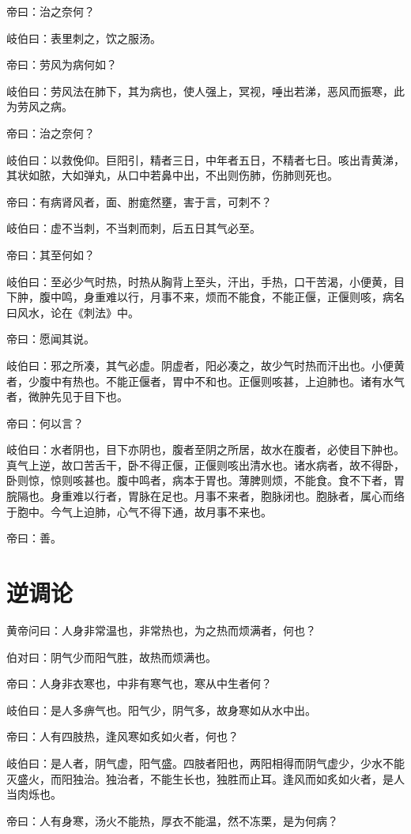 \documentclass{article}%
\begin{document}
帝曰：治之奈何？

岐伯曰：表里刺之，饮之服汤。

帝曰：劳风为病何如？

岐伯曰：劳风法在肺下，其为病也，使人强上，冥视，唾出若涕，恶风而振寒，此为劳风之病。

帝曰：治之奈何？

岐伯曰：以救俛仰。巨阳引，精者三日，中年者五日，不精者七日。咳出青黄涕，其状如脓，大如弹丸，从口中若鼻中出，不出则伤肺，伤肺则死也。

帝曰：有病肾风者，面、胕痝然壅，害于言，可刺不？

岐伯曰：虚不当刺，不当刺而刺，后五日其气必至。

帝曰：其至何如？

岐伯曰：至必少气时热，时热从胸背上至头，汗出，手热，口干苦渴，小便黄，目下肿，腹中鸣，身重难以行，月事不来，烦而不能食，不能正偃，正偃则咳，病名曰风水，论在《刺法》中。

帝曰：愿闻其说。

岐伯曰：邪之所凑，其气必虚。阴虚者，阳必凑之，故少气时热而汗出也。小便黄者，少腹中有热也。不能正偃者，胃中不和也。正偃则咳甚，上迫肺也。诸有水气者，微肿先见于目下也。

帝曰：何以言？

岐伯曰：水者阴也，目下亦阴也，腹者至阴之所居，故水在腹者，必使目下肿也。真气上逆，故口苦舌干，卧不得正偃，正偃则咳出清水也。诸水病者，故不得卧，卧则惊，惊则咳甚也。腹中鸣者，病本于胃也。薄脾则烦，不能食。食不下者，胃脘隔也。身重难以行者，胃脉在足也。月事不来者，胞脉闭也。胞脉者，属心而络于胞中。今气上迫肺，心气不得下通，故月事不来也。

帝曰：善。
\section{逆调论}
黄帝问曰：人身非常温也，非常热也，为之热而烦满者，何也？

伯对曰：阴气少而阳气胜，故热而烦满也。

帝曰：人身非衣寒也，中非有寒气也，寒从中生者何？

岐伯曰：是人多痹气也。阳气少，阴气多，故身寒如从水中出。

帝曰：人有四肢热，逢风寒如炙如火者，何也？

岐伯曰：是人者，阴气虚，阳气盛。四肢者阳也，两阳相得而阴气虚少，少水不能灭盛火，而阳独治。独治者，不能生长也，独胜而止耳。逢风而如炙如火者，是人当肉烁也。

帝曰：人有身寒，汤火不能热，厚衣不能温，然不冻栗，是为何病？
\end{document}

